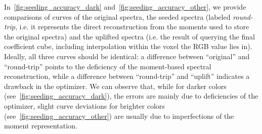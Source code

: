 In~\cref{fig:seeding_accuracy_dark} and~\cref{fig:seeding_accuracy_other}, we provide comparisons of curves of the original spectra, the seeded spectra (labeled \emph{round-trip}, i.e. it represents the direct reconstruction from the moments used to store the original spectra) and the uplifted spectra (i.e. the result of querying the final coefficient cube, including interpolation within the voxel the RGB value lies in). Ideally, all three curves should be identical: a difference between ``original'' and ``round-trip'' points to the deficiency of the moment-based spectral reconstruction, while a difference between ``round-trip'' and ``uplift'' indicates a drawback in the optimizer. We can observe that, while for darker colors (see~\cref{fig:seeding_accuracy_dark}), the errors are mainly due to deficiencies of the optimizer, slight curve deviations for brighter colors (see~\cref{fig:seeding_accuracy_other}) are usually due to imperfections of the moment representation.


